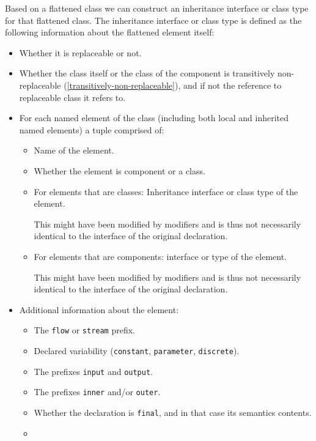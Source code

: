 Based on a flattened class we can construct an inheritance interface or
class type for that flattened class. The inheritance interface or class
type is defined as the following information about the flattened element
itself:
\begin{itemize}
\item
  Whether it is replaceable or not.
\item
  Whether the class itself or the class of the component is transitively
  non-replaceable (\autoref{transitively-non-replaceable}), and if not the reference to
  replaceable class it refers to.
\item
  For each named element of the class (including both local and
  inherited named elements) a tuple comprised of:
  \begin{itemize}
  \item
    Name of the element.
  \item
    Whether the element is component or a class.
  \item
    For elements that are classes: Inheritance interface or class type of the element.
    \begin{nonnormative}
    This might have been modified by modifiers and is thus not necessarily identical to the interface of the original declaration.
    \end{nonnormative}
  \item
    For elements that are components: interface or type of the element.
    \begin{nonnormative}
    This might have been modified by modifiers and is thus not necessarily identical to the interface of the original declaration.
    \end{nonnormative}
  \end{itemize}
\item
  Additional information about the element:
  \begin{itemize}
  \item
    The \lstinline!flow! or \lstinline!stream! prefix.
  \item
    Declared variability (\lstinline!constant!, \lstinline!parameter!, \lstinline!discrete!).
  \item
    The prefixes \lstinline!input! and \lstinline!output!.
  \item
    The prefixes \lstinline!inner! and/or \lstinline!outer!.
  \item
    Whether the declaration is \lstinline!final!, and in that case its semantics
    contents.
  \item

\end{itemize}
\end{itemize}
